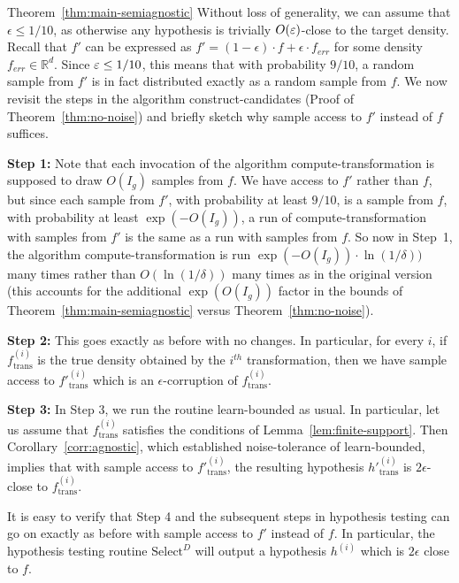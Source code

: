 \begin{proofof}{Theorem~\ref{thm:main-semiagnostic}}
Without loss of generality, we can assume that $\epsilon \leq 1/10$, as otherwise any hypothesis is trivially $O(\varepsilon)$-close to the target density. 
Recall that $f'$ can be expressed as $f' = (1-\epsilon) \cdot f + \epsilon \cdot f_{err}$ for some density $f_{err} \in \mathbb{R}^d$.  Since $\varepsilon \le 1/10$, this means that with probability $9/10$, a random sample from $f'$ is in fact distributed exactly as a random sample from $f$. We now revisit the steps in the algorithm \textsf{construct-candidates} (Proof of Theorem~\ref{thm:no-noise}) and briefly sketch why sample access to $f'$ instead of $f$ suffices.


\textbf{Step 1:} Note that each invocation of the algorithm \textsf{compute-transformation} is supposed to draw $O(I_g)$ samples from $f$.  We have access to $f'$ rather than $f$, but since each sample from $f'$, with probability at least $9/10$, is a sample from $f$,  with probability at least $\exp(-O(I_g))$, a run of \textsf{compute-transformation} with samples from $f'$ is the same as a run with samples from $f$.   So now in Step~1, the algorithm \textsf{compute-transformation} is run $\exp(-O(I_g)) \cdot \ln(1/\delta))$ many times rather than $O(\ln(1/\delta))$ many times as in the original version (this accounts for the additional $\exp(O(I_g))$ factor in the bounds of Theorem~\ref{thm:main-semiagnostic} versus Theorem~\ref{thm:no-noise}).

\textbf{Step 2:} This goes exactly as before with no changes. In particular, for every $i$, if ${f}_{\mathrm{trans}}^{(i)}$ is the true density obtained by the $i^{th}$ transformation, then we have sample access to ${f'}_{\mathrm{trans}}^{(i)}$  which is an $\epsilon$-corruption of ${f}_{\mathrm{trans}}^{(i)}$. 

\textbf{Step 3:} In Step $3$, we run the routine \textsf{learn-bounded} as usual. In particular, let us assume that ${f}_{\mathrm{trans}}^{(i)}$ satisfies the  conditions of Lemma~\ref{lem:finite-support}. Then Corollary~\ref{corr:agnostic}, which established noise-tolerance of \textsf{learn-bounded}, implies that with sample access to ${f'}_{\mathrm{trans}}^{(i)}$, the resulting hypothesis ${h'}_{\mathrm{trans}}^{(i)}$ is $2\epsilon$-close to ${f}_{\mathrm{trans}}^{(i)}$. 

It is easy to verify that Step 4 and the subsequent steps in hypothesis testing can go on exactly as before with sample access to $f'$ instead of $f$. In particular, the hypothesis testing routine $\mathrm{Select}^D$ will output a hypothesis ${h}^{(i)}$ which is $2\epsilon$ close to $f$. 
\end{proofof}
